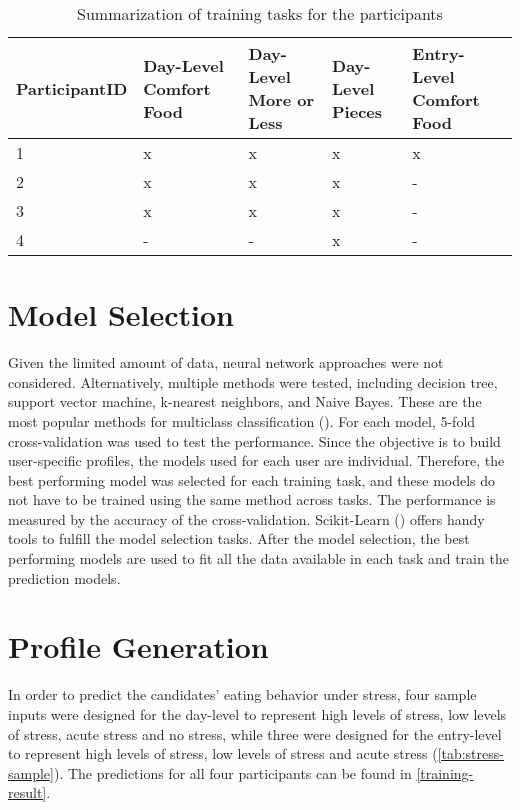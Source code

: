 \begin{table}[htpb]
  \caption[Models Trained]{Summarization of training tasks for the participants}\label{tab:models}
  \centering
  \tiny
  \begin{tabular}{l l l l l}
    \toprule
      ParticipantID & Day-Level Comfort Food & Day-Level More or Less & Day-Level Pieces & Entry-Level Comfort Food \\
    \midrule
      1 & x & x & x & x \\
      2 & x & x & x & - \\
      3 & x & x & x & - \\
      4 & - & - & x & - \\
    \bottomrule
  \end{tabular}
\end{table}

\bigskip
\section{Model Selection}
Given the limited amount of data, neural network approaches were not considered. Alternatively, multiple methods were tested, including decision tree, support vector machine, k-nearest neighbors, and Naive Bayes. These are the most popular methods for multiclass classification (\cite{43_multiclass_classification}). For each model, 5-fold cross-validation was used to test the performance. Since the objective is to build user-specific profiles, the models used for each user are individual. Therefore, the best performing model was selected for each training task, and these models do not have to be trained using the same method across tasks. The performance is measured by the accuracy of the cross-validation. Scikit-Learn (\cite{44_sklearn}) offers handy tools to fulfill the model selection tasks. After the model selection, the best performing models are used to fit all the data available in each task and train the prediction models.

\section{Profile Generation}
In order to predict the candidates' eating behavior under stress, four sample inputs were designed for the day-level to represent high levels of stress, low levels of stress, acute stress and no stress, while three were designed for the entry-level to represent high levels of stress, low levels of stress and acute stress (\autoref{tab:stress-sample}). The predictions for all four participants can be found in \autoref{training-result}.

